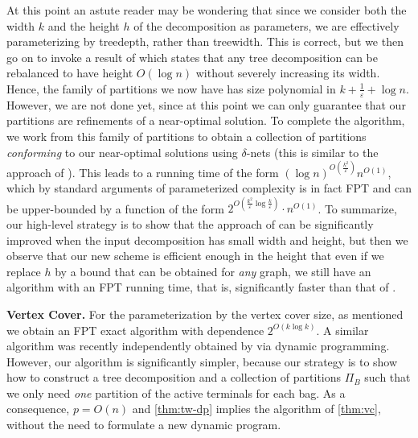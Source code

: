 \documentclass[a4paper]{article}
\let\oldcitet\citet
\renewcommand{\citet}[1]{\mbox{\oldcitet{#1}}}
\theoremstyle{plain}
\newcommand{\eps}{{\varepsilon}}
\begin{document}
At this point an astute reader may be wondering that since we consider both the
width $k$ and the height $h$ of the decomposition as parameters, we are
effectively parameterizing by treedepth, rather than treewidth. This is
correct, but we then go on to invoke a result of \citet{BodlaenderH98} which
states that any tree decomposition can be rebalanced to have height $O(\log n)$
without severely increasing its width. Hence, the family of partitions we now
have has size polynomial in $k+\frac{1}{\eps}+\log n$. 
However, we are not done yet, since at this point we can
only guarantee that our partitions are refinements of a near-optimal
solution. To complete the algorithm, we work from this family of partitions to
obtain a collection of partitions \emph{conforming} to our near-optimal
solutions using $\delta$-nets (this is similar to the approach of
\cite{bateni2011approximation}). This leads to a running time of the form
$(\log n)^{O(\frac{k^2}{\eps})}n^{O(1)}$, which by standard arguments of parameterized
complexity is in fact FPT and can be upper-bounded by a function of the form
$2^{O(\frac{k^2}{\eps}\log\frac{k}{\eps})}\cdot n^{O(1)}$. 
To summarize, our high-level strategy is to
show that the approach of \cite{bateni2011approximation} can be significantly
improved when the input decomposition has small width and height, but then we
observe that our new scheme is efficient enough in the height that even if we
replace $h$ by a bound that can be obtained for \emph{any} graph, we still have
an algorithm with an FPT running time, that is, significantly faster than that
of \cite{bateni2011approximation}. 

\smallskip
\textbf{Vertex Cover.} For the parameterization by the vertex cover size, as
mentioned we obtain an FPT exact algorithm with dependence $2^{O(k\log k)}$. A
similar algorithm was recently independently obtained by
\citet{bodlaender2023complexity} via dynamic programming. However, our
algorithm is significantly simpler, because our strategy is to show how to
construct a tree decomposition and a collection of partitions $\Pi_B$ such that
we only need \emph{one} partition of the active terminals for each bag. As a
consequence, $p=O(n)$ and \autoref{thm:tw-dp} implies the algorithm of
\autoref{thm:vc}, without the need to formulate a new dynamic program.
\end{document}
